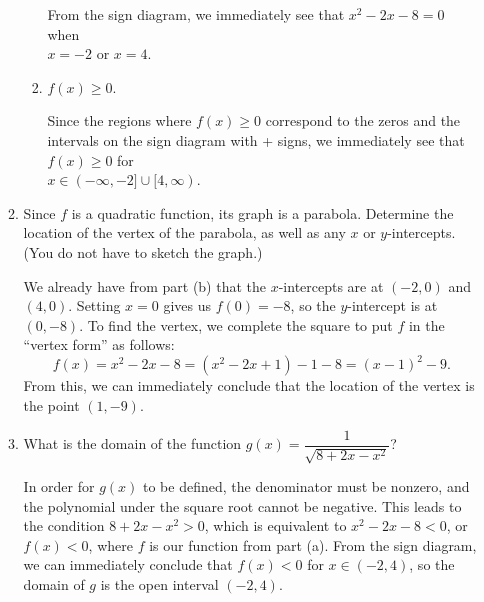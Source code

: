 \documentclass[12pt]{article}
\newcommand{\points}[1]{\marginpar{\hspace{24pt}[#1]}}
\begin{document}
\begin{enumerate}
\begin{enumerate}
\begin{enumerate}
\bigskip

From the sign diagram, we immediately see that $x^2-2x-8=0$ when\\ $x=-2$ or $x=4$.


\bigskip

 \item $f(x)\geq 0$. \points{1}

\bigskip

Since the regions where $f(x)\geq 0$ correspond to the zeros and the intervals on the sign diagram with + signs, we immediately see that $f(x)\geq 0$ for\\ $x\in (-\infty, -2]\cup [4,\infty)$.

\bigskip

\end{enumerate}



\item Since $f$ is a quadratic function, its graph is a parabola. Determine the location of the vertex of the parabola, as well as any $x$ or $y$-intercepts. (You do not have to sketch the graph.) \points{4}

\bigskip

We already have from part (b) that the $x$-intercepts are at $(-2,0)$ and $(4,0)$. Setting $x=0$ gives us $f(0)=-8$, so the $y$-intercept is at $(0,-8)$. To find the vertex, we complete the square to put $f$ in the ``vertex form'' as follows:
\[
 f(x) = x^2-2x-8 = (x^2-2x+1)-1-8 = (x-1)^2-9.
\]
From this, we can immediately conclude that the location of the vertex is the point $(1,-9)$.

\bigskip

\item What is the domain of the function $g(x) = \dfrac{1}{\sqrt{8+2x-x^2}}$? \points{1}

\bigskip

In order for $g(x)$ to be defined, the denominator must be nonzero, and the polynomial under the square root cannot be negative. This leads to the condition $8+2x-x^2>0$, which is equivalent to $x^2-2x-8<0$, or $f(x)<0$, where $f$ is our function from part (a). From the sign diagram, we can immediately conclude that $f(x)<0$ for $x\in (-2,4)$, so the domain of $g$ is the open interval $(-2,4)$.

\end{enumerate}


\end{enumerate}
\end{document}
